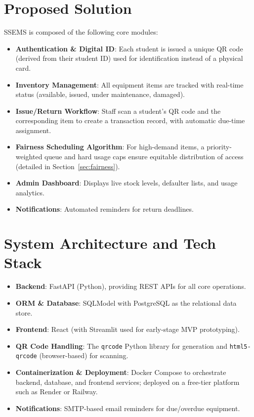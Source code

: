 \documentclass{article}
\begin{document}
\section{Proposed Solution}
SSEMS is composed of the following core modules:
\begin{itemize}
    \item \textbf{Authentication \& Digital ID}: Each student is issued a unique QR code (derived from their student ID) used for identification instead of a physical card.
    \item \textbf{Inventory Management}: All equipment items are tracked with real-time status (available, issued, under maintenance, damaged).
    \item \textbf{Issue/Return Workflow}: Staff scan a student's QR code and the corresponding item to create a transaction record, with automatic due-time assignment.
    \item \textbf{Fairness Scheduling Algorithm}: For high-demand items, a priority-weighted queue and hard usage caps ensure equitable distribution of access (detailed in Section~\ref{sec:fairness}).
    \item \textbf{Admin Dashboard}: Displays live stock levels, defaulter lists, and usage analytics.
    \item \textbf{Notifications}: Automated reminders for return deadlines.
\end{itemize}

\section{System Architecture and Tech Stack}
\begin{itemize}
    \item \textbf{Backend}: FastAPI (Python), providing REST APIs for all core operations.
    \item \textbf{ORM \& Database}: SQLModel with PostgreSQL as the relational data store.
    \item \textbf{Frontend}: React (with Streamlit used for early-stage MVP prototyping).
    \item \textbf{QR Code Handling}: The \texttt{qrcode} Python library for generation and \texttt{html5-qrcode} (browser-based) for scanning.
    \item \textbf{Containerization \& Deployment}: Docker Compose to orchestrate backend, database, and frontend services; deployed on a free-tier platform such as Render or Railway.
    \item \textbf{Notifications}: SMTP-based email reminders for due/overdue equipment.
\end{itemize}
\end{document}
